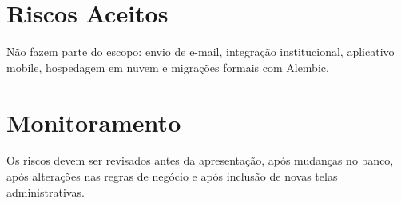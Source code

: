 \documentclass[12pt,a4paper]{article}
\begin{document}
\section{Riscos Aceitos}
Não fazem parte do escopo: envio de e-mail, integração institucional, aplicativo mobile, hospedagem em nuvem e migrações formais com Alembic.

\section{Monitoramento}
Os riscos devem ser revisados antes da apresentação, após mudanças no banco, após alterações nas regras de negócio e após inclusão de novas telas administrativas.
\end{document}

